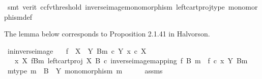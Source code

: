\begin{isabellebody}
\ {\isacharparenleft}{\kern0pt}smt\ {\isacharparenleft}{\kern0pt}verit{\isacharcomma}{\kern0pt}\ ccfv{\isacharunderscore}{\kern0pt}threshold{\isacharparenright}{\kern0pt}\ inverse{\isacharunderscore}{\kern0pt}image{\isacharunderscore}{\kern0pt}monomorphism\ left{\isacharunderscore}{\kern0pt}cart{\isacharunderscore}{\kern0pt}proj{\isacharunderscore}{\kern0pt}type\ monomorphism{\isacharunderscore}{\kern0pt}def{}{\isacharparenright}{\kern0pt}\isanewline
{}\isamarkupfalse%
%
\endisatagproof
{\isafoldproof}%
%
\isadelimproof
%
\endisadelimproof
%
\begin{isamarkuptext}%
The lemma below corresponds to Proposition 2.1.41 in Halvorson.%
\end{isamarkuptext}\isamarkuptrue%
\isamarkupfalse%
\ in{\isacharunderscore}{\kern0pt}inverse{\isacharunderscore}{\kern0pt}image{\isacharcolon}{\kern0pt}\isanewline
\ \ \ {\isachardoublequoteopen}f\ {\isacharcolon}{\kern0pt}\ X\ {\isasymrightarrow}\ Y{\isachardoublequoteclose}\ {\isachardoublequoteopen}{\isacharparenleft}{\kern0pt}B{\isacharcomma}{\kern0pt}m{\isacharparenright}{\kern0pt}\ {\isasymsubseteq}\isactrlsub c\ Y{\isachardoublequoteclose}\ {\isachardoublequoteopen}x\ {\isasymin}\isactrlsub c\ X{\isachardoublequoteclose}\isanewline
\ \ \ {\isachardoublequoteopen}{\isacharparenleft}{\kern0pt}x\ {\isasymin}\isactrlbsub X\isactrlesub \ {\isacharparenleft}{\kern0pt}f\isactrlsup {\isacharminus}{\kern0pt}B{\isasymrparr}\isactrlbsub m\isactrlesub {\isacharcomma}{\kern0pt}\ left{\isacharunderscore}{\kern0pt}cart{\isacharunderscore}{\kern0pt}proj\ X\ B\ {\isasymcirc}\isactrlsub c\ inverse{\isacharunderscore}{\kern0pt}image{\isacharunderscore}{\kern0pt}mapping\ f\ B\ m{\isacharparenright}{\kern0pt}{\isacharparenright}{\kern0pt}\ {\isacharequal}{\kern0pt}\ {\isacharparenleft}{\kern0pt}f\ {\isasymcirc}\isactrlsub c\ x\ {\isasymin}\isactrlbsub Y\isactrlesub \ {\isacharparenleft}{\kern0pt}B{\isacharcomma}{\kern0pt}m{\isacharparenright}{\kern0pt}{\isacharparenright}{\kern0pt}{\isachardoublequoteclose}\isanewline
%
\isadelimproof
%
\endisadelimproof
%
\isatagproof
{}\isamarkupfalse%
\isanewline
\ \ \isamarkupfalse%
\ m{\isacharunderscore}{\kern0pt}type{\isacharcolon}{\kern0pt}\ {\isachardoublequoteopen}m\ {\isacharcolon}{\kern0pt}\ B\ {\isasymrightarrow}\ Y{\isachardoublequoteclose}\ {\isachardoublequoteopen}monomorphism\ m{\isachardoublequoteclose}\isanewline
\ \ \ \ \isamarkupfalse%
\ assms{\isacharparenleft}{\kern0pt}{}{\isacharparenright}{\kern0pt}\ \isamarkupfalse%

\end{isabellebody}
